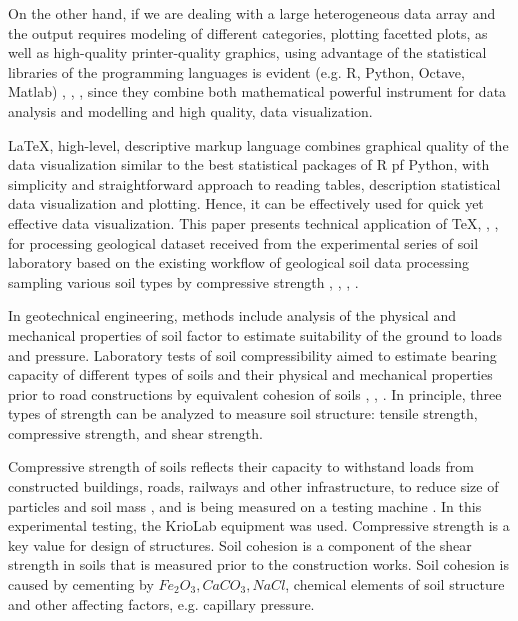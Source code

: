 \documentclass[a4paper,10pt]{article}
\begin{document}
On the other hand, if we are dealing with a large heterogeneous data array and the output requires modeling of different categories, plotting facetted plots, as well as high-quality printer-quality graphics, using advantage of the statistical libraries of the programming languages is evident (e.g. R, Python, Octave, Matlab) \cite{Lemenkova201871}, \cite{Lemenkova2019104}, \cite{Lemenkova2019100}, since they combine both mathematical powerful instrument for data analysis and  modelling and high quality, data visualization. 

\LaTeX, high-level, descriptive markup language combines graphical quality of the data visualization similar to the best statistical packages of R pf Python, with simplicity and straightforward approach to reading tables, description statistical data visualization and plotting. Hence, it can be effectively used for quick yet effective data visualization. This paper presents technical application of \TeX \space \cite{Knuth1990}, \cite{Knuth1986}, \cite{Knuth1984}, \cite{Knuth1968} for processing geological dataset received from the experimental series of soil laboratory based on the existing workflow of geological soil data processing sampling various soil types by compressive strength \cite{Lemenkov2018b}, \cite{Dahlinetal1999}, \cite{Lemenkov2018c}, \cite{Lindh2004}.

In geotechnical engineering, methods include analysis of the physical and mechanical properties of soil factor to estimate suitability of the ground to loads and pressure. Laboratory tests of soil compressibility aimed to estimate bearing capacity of different types of soils and their physical and mechanical properties prior to road constructions by equivalent cohesion of soils \cite{Boldyrevetal2006}, \cite{Lemenkov2018f}, \cite{RidleyBurland}. In principle, three types of strength can be analyzed to measure soil structure: tensile strength, compressive strength, and shear strength. 

Compressive strength of soils reflects their capacity to withstand loads from constructed buildings, roads, railways and other infrastructure, to reduce size of particles and soil mass \cite{Ganetal1988}, and is being measured on a testing machine \cite{Lemenkov2018a}. In this experimental testing, the KrioLab equipment was used. Compressive strength is a key value for design of structures. Soil cohesion is a component of the shear strength in soils that is measured prior to the construction works. Soil cohesion is caused by cementing by $Fe_{2}O_{3}, CaCO_{3}, NaCl$, chemical elements of soil structure \cite{Lemenkov2018g} and other affecting factors, e.g. capillary pressure. 
\end{document}
